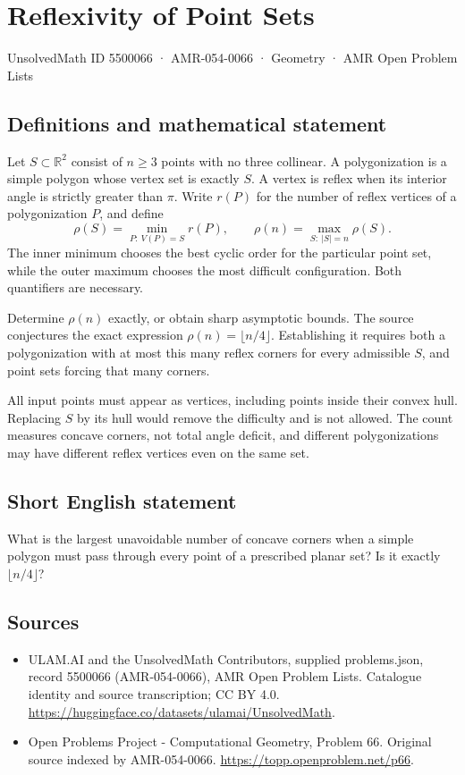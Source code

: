 \documentclass[11pt,a4paper]{article}
\begin{document}
\section*{Reflexivity of Point Sets}\label{5500066}
{\small UnsolvedMath ID 5500066 · AMR-054-0066 · Geometry · AMR Open Problem Lists}
\subsection{Definitions and mathematical statement}
Let $S\subset\mathbb R^2$ consist of $n\ge3$ points with no three
collinear. A polygonization is a simple polygon whose vertex set
is exactly $S$. A vertex is reflex when its interior angle is
strictly greater than $\pi$. Write $r(P)$ for the number of
reflex vertices of a polygonization $P$, and define
\[
 \rho(S)=\min_{P:\ V(P)=S}r(P),\qquad
 \rho(n)=\max_{S:\ |S|=n}\rho(S).
\]
The inner minimum chooses the best cyclic order for the particular
point set, while the outer maximum chooses the most difficult
configuration. Both quantifiers are necessary.

Determine $\rho(n)$ exactly, or obtain sharp asymptotic bounds.
The source conjectures the exact expression
$\rho(n)=\lfloor n/4\rfloor$. Establishing it requires both a
polygonization with at most this many reflex corners for every
admissible $S$, and point sets forcing that many corners.

All input points must appear as vertices, including points inside
their convex hull. Replacing $S$ by its hull would remove the
difficulty and is not allowed. The count measures concave corners,
not total angle deficit, and different polygonizations may have
different reflex vertices even on the same set.
\subsection{Short English statement}
What is the largest unavoidable number of concave corners when
a simple polygon must pass through every point of a prescribed
planar set? Is it exactly $\lfloor n/4\rfloor$?
\subsection{Sources}
\begin{itemize}
\item[S1] ULAM.AI and the UnsolvedMath Contributors, supplied problems.json, record 5500066 (AMR-054-0066), AMR Open Problem Lists. Catalogue identity and source transcription; CC BY 4.0.
\url{https://huggingface.co/datasets/ulamai/UnsolvedMath}.
\item[S2] Open Problems Project - Computational Geometry, Problem 66. Original source indexed by AMR-054-0066.
\url{https://topp.openproblem.net/p66}.
\end{itemize}
\end{document}
